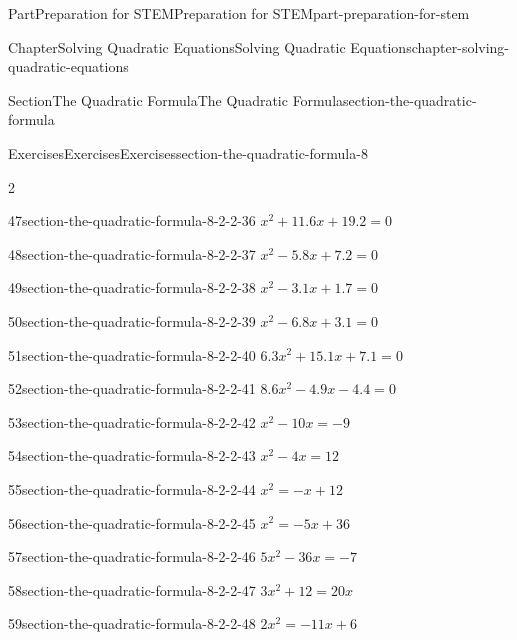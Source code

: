 \documentclass[twoside,10pt,]{book}
\numberwithin{equation}{section}
\begin{document}
\begin{partptx}{Part}{Preparation for STEM}{}{Preparation for STEM}{}{}{part-preparation-for-stem}
\begin{chapterptx}{Chapter}{Solving Quadratic Equations}{}{Solving Quadratic Equations}{}{}{chapter-solving-quadratic-equations}
\begin{sectionptx}{Section}{The Quadratic Formula}{}{The Quadratic Formula}{}{}{section-the-quadratic-formula}
\begin{exercises-subsection}{Exercises}{Exercises}{}{Exercises}{}{}{section-the-quadratic-formula-8}
\begin{exercisegroupcol}{2}
\begin{divisionexerciseegcol}{47}{}{}{section-the-quadratic-formula-8-2-2-36}
\({x^{2}+11.6x+19.2}=0\)%
\end{divisionexerciseegcol}%
\begin{divisionexerciseegcol}{48}{}{}{section-the-quadratic-formula-8-2-2-37}%
\({x^{2}-5.8x+7.2}=0\)%
\end{divisionexerciseegcol}%
\begin{divisionexerciseegcol}{49}{}{}{section-the-quadratic-formula-8-2-2-38}%
\({x^{2}-3.1x+1.7}=0\)%
\end{divisionexerciseegcol}%
\begin{divisionexerciseegcol}{50}{}{}{section-the-quadratic-formula-8-2-2-39}%
\({x^{2}-6.8x+3.1}=0\)%
\end{divisionexerciseegcol}%
\begin{divisionexerciseegcol}{51}{}{}{section-the-quadratic-formula-8-2-2-40}%
\({6.3x^{2}+15.1x+7.1}=0\)%
\end{divisionexerciseegcol}%
\begin{divisionexerciseegcol}{52}{}{}{section-the-quadratic-formula-8-2-2-41}%
\({8.6x^{2}-4.9x-4.4}=0\)%
\end{divisionexerciseegcol}%
\begin{divisionexerciseegcol}{53}{}{}{section-the-quadratic-formula-8-2-2-42}%
\({x^{2}-10x}={-9}\)%
\end{divisionexerciseegcol}%
\begin{divisionexerciseegcol}{54}{}{}{section-the-quadratic-formula-8-2-2-43}%
\({x^{2}-4x}={12}\)%
\end{divisionexerciseegcol}%
\begin{divisionexerciseegcol}{55}{}{}{section-the-quadratic-formula-8-2-2-44}%
\({x^{2}}={-x+12}\)%
\end{divisionexerciseegcol}%
\begin{divisionexerciseegcol}{56}{}{}{section-the-quadratic-formula-8-2-2-45}%
\({x^{2}}={-5x+36}\)%
\end{divisionexerciseegcol}%
\begin{divisionexerciseegcol}{57}{}{}{section-the-quadratic-formula-8-2-2-46}%
\({5x^{2}-36x}={-7}\)%
\end{divisionexerciseegcol}%
\begin{divisionexerciseegcol}{58}{}{}{section-the-quadratic-formula-8-2-2-47}%
\({3x^{2}+12}={20x}\)%
\end{divisionexerciseegcol}%
\begin{divisionexerciseegcol}{59}{}{}{section-the-quadratic-formula-8-2-2-48}%
\({2x^{2}}={-11x+6}\)%
\end{divisionexerciseegcol}%

\end{exercisegroupcol}
\end{exercises-subsection}
\end{sectionptx}
\end{chapterptx}
\end{partptx}
\end{document}
